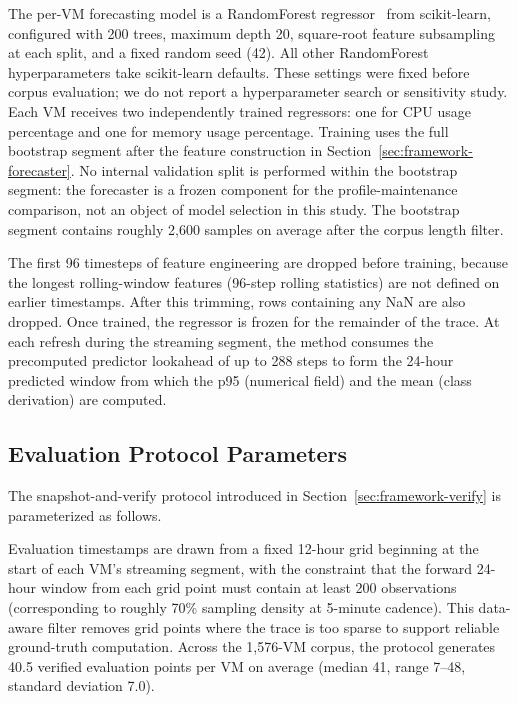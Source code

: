 \documentclass[manuscript,screen,review,anonymous]{acmart}
\begin{document}
The per-VM forecasting model is a RandomForest
regressor~\cite{breiman_random_forests_2001} from scikit-learn,
configured with 200 trees, maximum depth 20, square-root feature
subsampling at each split, and a fixed random seed (42). All
other RandomForest hyperparameters take scikit-learn defaults.
These settings were fixed before corpus evaluation; we do not
report a hyperparameter search or sensitivity study. Each VM
receives two independently trained regressors: one for CPU usage
percentage and one for memory usage percentage. Training uses the
full bootstrap segment after the feature construction in
Section~\ref{sec:framework-forecaster}. No internal validation
split is performed within the bootstrap segment: the forecaster
is a frozen component for the profile-maintenance comparison, not
an object of model selection in this study. The bootstrap segment
contains roughly 2{,}600 samples on average after the corpus
length filter.

The first 96 timesteps of feature engineering are dropped before
training, because the longest rolling-window features (96-step
rolling statistics) are not defined on earlier timestamps. After
this trimming, rows containing any NaN are also dropped. Once
trained, the regressor is frozen for the remainder of the trace.
At each refresh during the streaming segment, the method consumes
the precomputed predictor lookahead of up to 288 steps to form the
24-hour predicted window from which the p95 (numerical field) and
the mean (class derivation) are computed.

\subsection{Evaluation Protocol Parameters}\label{sec:setup-eval}

The snapshot-and-verify protocol introduced in
Section~\ref{sec:framework-verify} is parameterized as follows.

Evaluation timestamps are drawn from a fixed 12-hour grid
beginning at the start of each VM's streaming segment, with the
constraint that the forward 24-hour window from each grid point
must contain at least 200 observations (corresponding to roughly
70\% sampling density at 5-minute cadence). This data-aware
filter removes grid points where the trace is too sparse to
support reliable ground-truth computation. Across the 1{,}576-VM
corpus, the protocol generates 40.5 verified evaluation points
per VM on average (median 41, range 7--48, standard deviation
7.0).
\end{document}
